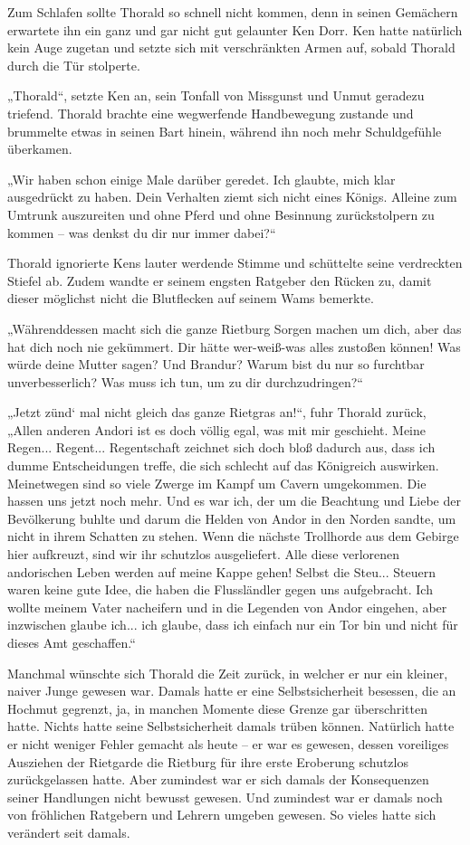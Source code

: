 \documentclass[10pt, a4paper, oneside]{book}
\begin{document}
Zum Schlafen sollte Thorald so schnell nicht kommen, denn in seinen Gemächern erwartete ihn ein ganz und gar nicht gut gelaunter Ken Dorr. Ken hatte natürlich kein Auge zugetan und setzte sich mit verschränkten Armen auf, sobald Thorald durch die Tür stolperte.

„Thorald“, setzte Ken an, sein Tonfall von Missgunst und Unmut geradezu triefend. Thorald brachte eine wegwerfende Handbewegung zustande und brummelte etwas in seinen Bart hinein, während ihn noch mehr Schuldgefühle überkamen.

„Wir haben schon einige Male darüber geredet. Ich glaubte, mich klar ausgedrückt zu haben. Dein Verhalten ziemt sich nicht eines Königs. Alleine zum Umtrunk auszureiten und ohne Pferd und ohne Besinnung zurückstolpern zu kommen – was denkst du dir nur immer dabei?“

Thorald ignorierte Kens lauter werdende Stimme und schüttelte seine verdreckten Stiefel ab. Zudem wandte er seinem engsten Ratgeber den Rücken zu, damit dieser möglichst nicht die Blutflecken auf seinem Wams bemerkte.

„Währenddessen macht sich die ganze Rietburg Sorgen machen um dich, aber das hat dich noch nie gekümmert. Dir hätte wer-weiß-was alles zustoßen können! Was würde deine Mutter sagen? Und Brandur? Warum bist du nur so furchtbar unverbesserlich? Was muss ich tun, um zu dir durchzudringen?“

„Jetzt zünd‘ mal nicht gleich das ganze Rietgras an!“, fuhr Thorald zurück, „Allen anderen Andori ist es doch völlig egal, was mit mir geschieht. Meine Regen... Regent... Regentschaft zeichnet sich doch bloß dadurch aus, dass ich dumme Entscheidungen treffe, die sich schlecht auf das Königreich auswirken. Meinetwegen sind so viele Zwerge im Kampf um Cavern umgekommen. Die hassen uns jetzt noch mehr. Und es war ich, der um die Beachtung und Liebe der Bevölkerung buhlte und darum die Helden von Andor in den Norden sandte, um nicht in ihrem Schatten zu stehen. Wenn die nächste Trollhorde aus dem Gebirge hier aufkreuzt, sind wir ihr schutzlos ausgeliefert. Alle diese verlorenen andorischen Leben werden auf meine Kappe gehen! Selbst die Steu... Steuern waren keine gute Idee, die haben die Flussländler gegen uns aufgebracht. Ich wollte meinem Vater nacheifern und in die Legenden von Andor eingehen, aber inzwischen glaube ich... ich glaube, dass ich einfach nur ein Tor bin und nicht für dieses Amt geschaffen.“

Manchmal wünschte sich Thorald die Zeit zurück, in welcher er nur ein kleiner, naiver Junge gewesen war. Damals hatte er eine Selbstsicherheit besessen, die an Hochmut gegrenzt, ja, in manchen Momente diese Grenze gar überschritten hatte. Nichts hatte seine Selbstsicherheit damals trüben können. Natürlich hatte er nicht weniger Fehler gemacht als heute – er war es gewesen, dessen voreiliges Ausziehen der Rietgarde die Rietburg für ihre erste Eroberung schutzlos zurückgelassen hatte. Aber zumindest war er sich damals der Konsequenzen seiner Handlungen nicht bewusst gewesen. Und zumindest war er damals noch von fröhlichen Ratgebern und Lehrern umgeben gewesen. So vieles hatte sich verändert seit damals.
\end{document}
